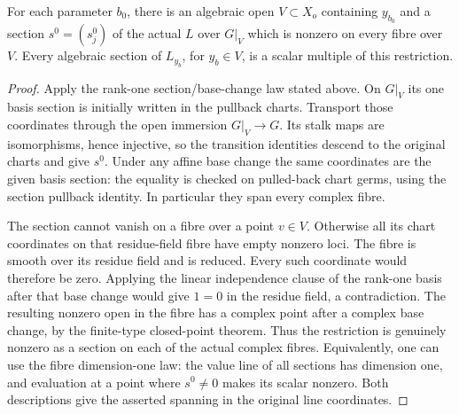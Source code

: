 \begin{lemma}
\label{lem:ftb-local-algebraic-theta-section}
For each parameter \(b_0\), there is an algebraic open
\(V\subset X_o\) containing \(y_{b_0}\) and a section
\(s^0=(s^0_j)\) of the actual \(L\) over \(G|_V\) which is
nonzero on every fibre over \(V\).
Every algebraic section of \(L_{y_b}\), for \(y_b\in V\),
is a scalar multiple of this restriction.
\end{lemma}
\begin{proof}
Apply the rank-one section/base-change law stated above.
On \(G|_V\) its one basis section is initially written in
the pullback charts.  Transport those coordinates through
the open immersion \(G|_V\to G\).
Its stalk maps are isomorphisms, hence injective, so the
transition identities descend to the original charts and
give \(s^0\).  Under any affine base change the same
coordinates are the given basis section: the equality
is checked on pulled-back chart germs, using the section
pullback identity.  In particular they span every complex
fibre.

The section cannot vanish on a fibre over a point \(v\in V\).
Otherwise all its chart coordinates on that residue-field
fibre have empty nonzero loci.  The fibre is smooth over
its residue field and is reduced.  Every such coordinate
would therefore be zero.  Applying the linear independence
clause of the rank-one basis after that base change would
give \(1=0\) in the residue field, a contradiction.
The resulting nonzero open in the fibre has a complex
point after a complex base change, by the finite-type
closed-point theorem.  Thus the restriction is genuinely
nonzero as a section on each of the actual complex fibres.
Equivalently, one can use the fibre dimension-one law:
the value line of all sections has dimension one, and
evaluation at a point where \(s^0\ne0\) makes its scalar
nonzero.  Both descriptions give the asserted spanning
in the original line coordinates.
\end{proof}

